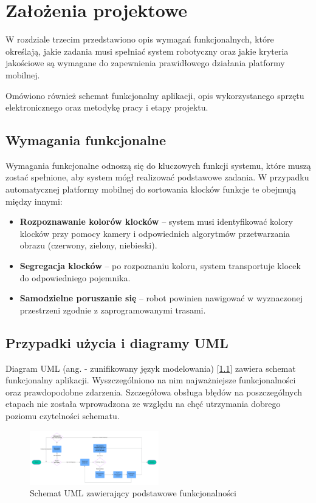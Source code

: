 \chapter{Założenia projektowe}
\label{ch:zalozenia-wstepne}

W rozdziale trzecim przedstawiono opis wymagań funkcjonalnych, które określają, jakie zadania musi spełniać system robotyczny oraz jakie kryteria jakościowe są wymagane do zapewnienia prawidłowego działania platformy mobilnej. 

Omówiono również schemat funkcjonalny aplikacji, opis wykorzystanego sprzętu elektronicznego oraz metodykę pracy i etapy projektu.
 

\section{Wymagania funkcjonalne}
Wymagania funkcjonalne odnoszą się do kluczowych funkcji systemu, które muszą zostać spełnione, aby system mógł realizować podstawowe zadania. W przypadku automatycznej platformy mobilnej do sortowania klocków funkcje te obejmują między innymi:
\begin{itemize}
    \item \textbf{Rozpoznawanie kolorów klocków} – system musi identyfikować kolory klocków przy pomocy kamery i odpowiednich algorytmów przetwarzania obrazu (czerwony, zielony, niebieski).
    \item \textbf{Segregacja klocków} – po rozpoznaniu koloru, system transportuje klocek do odpowiedniego pojemnika.
    \item \textbf{Samodzielne poruszanie się} – robot powinien nawigować w wyznaczonej przestrzeni zgodnie z zaprogramowanymi trasami.
\end{itemize}

\section{Przypadki użycia i diagramy UML}

Diagram UML (ang.  - zunifikowany język modelowania) [\ref{rys1:schemat_uml}] zawiera schemat funkcjonalny aplikacji. Wyszczególniono na nim najważniejsze funkcjonalności oraz prawdopodobne zdarzenia. Szczegółowa obsługa błędów na poszczególnych etapach nie została wprowadzona ze względu na chęć utrzymania dobrego poziomu czytelności schematu. 

\begin{figure}[H]
    \centering
    \includegraphics[angle=90,origin=c,width=0.5\textwidth]{./graf/uml.png}
    \caption{Schemat UML zawierający podstawowe funkcjonalności}
    \label{rys1:schemat_uml}
\end{figure}

